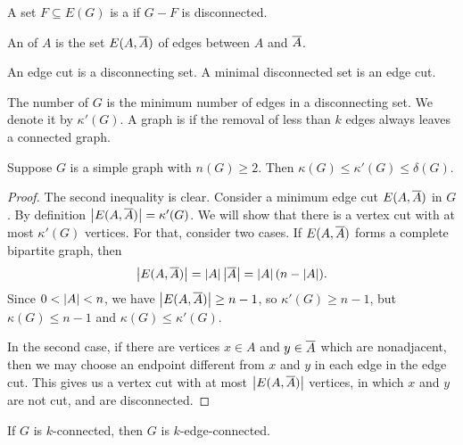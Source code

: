 
\begin{definition}
  A set $F \subseteq E(G)$ is a  if $G - F$ is
  disconnected.
\end{definition}

\begin{definition}
  An  of $A$ is the set $E(A, \overline{A})$ of edges between $A$ and
  $\overline{A}$.
\end{definition}

\begin{remark}
  An edge cut is a disconnecting set.
  A minimal disconnected set is an edge cut.
\end{remark}

\begin{definition}
  The  number of $G$ is the minimum number of edges in
  a disconnecting set.
  We denote it by $\kappa'(G)$.
  A graph is  if the removal of less than $k$ edges
  always leaves a connected graph.
\end{definition}

\begin{theorem}
  Suppose $G$ is a simple graph with $n(G) \ge 2$.
  Then $\kappa(G) \le \kappa'(G) \le \delta(G)$.
\end{theorem}

\begin{proof}
  The second inequality is clear.
  Consider a minimum edge cut $E(A, \overline{A})$ in $G$.
  By definition $\left| E(A, \overline{A}) \right| = \kappa'(G)$.
  We will show that there is a vertex cut with at most $\kappa'(G)$ vertices.
  For that, consider two cases.
  If $E(A, \overline{A})$ forms a complete bipartite graph, then
  \[
	\left| E(A, \overline{A}) \right| =
	\left| A \right| \left| \overline{A} \right| = \left| A \right| (n - \left| A \right|).
  \]
  Since $0 < \left| A \right| < n$, we have $\left| E(A, \overline{A}) \right| \ge n-1$, so $\kappa'(G)
  \ge n-1$, but $\kappa(G) \le n-1$ and $\kappa(G) \le \kappa'(G)$.

  In the second case, if there are vertices $x \in A$ and $y \in \overline{A}$ which
  are nonadjacent, then we may choose an endpoint different from $x$ and $y$ in
  each edge in the edge cut.
  This gives us a vertex cut with at most $\left| E(A, \overline{A}) \right|$ vertices, in
  which $x$ and $y$ are not cut, and are disconnected.
\end{proof}

\begin{corollary}
  If $G$ is $k$-connected, then $G$ is $k$-edge-connected.
\end{corollary}

